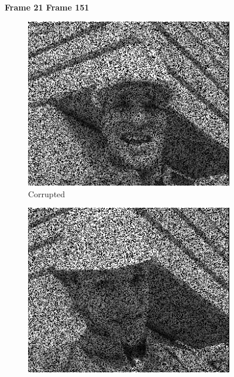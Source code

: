 \begin{figure}
  \centering
  \textbf{\hspace{0.5in} Frame 21 \hspace{1.5in} Frame 151\hspace{0.5in}\vspace{0.2in}}
  \begin{subfigure}{0.4\textwidth}
    \includegraphics[width=\textwidth]{Chapter5/Images/foreman_masked_21.png}
    \caption{Corrupted}
  \end{subfigure}
  \begin{subfigure}{0.4\textwidth}
    \includegraphics[width=\textwidth]{Chapter5/Images/foreman_masked_151.png}

\end{subfigure}
\end{figure}
